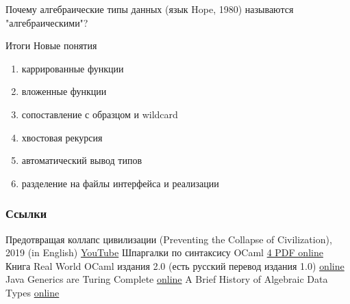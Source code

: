 \documentclass[aspectratio=169
  , xcolor={svgnames}
  , hyperref=
      { colorlinks
      , urlcolor=DarkBlue
      }
  , russian  %
  ]{beamer}
\begin{document}
\begin{frame}
\begin{center}
\Large{Почему алгебраические типы данных (язык Hope, 1980) называются "алгебраическими"?}
\vspace{5em}

\end{center}
\end{frame}


\begin{frame}{Итоги}
Новые понятия
\begin{enumerate}
\item каррированные функции
\item вложенные функции
\item сопоставление с образцом и wildcard
\item хвостовая рекурсия
\item автоматический вывод типов
\item разделение на файлы интерфейса и реализации
\end{enumerate}
\end{frame}

\begin{frame}[allowframebreaks]
\frametitle<presentation>{Ссылки}
\begin{thebibliography}{10}
    Предотвращая коллапс цивилизации (Preventing the Collapse of Civilization), 2019 (in English)
    \newblock\href{https://youtu.be/pW-SOdj4Kkk}{YouTube}
    Шпаргалки по синтаксису OCaml
    \newblock\href{https://ocaml.org/docs/cheat_sheets.html}{4 PDF online}
    Книга Real World OCaml издания 2.0 (есть русский перевод издания 1.0)
    \newblock\href{https://dev.realworldocaml.org/toc.html}{online}
    Java Generics are Turing Complete
    \newblock\href{https://arxiv.org/pdf/1605.05274}{online}
    A Brief History of Algebraic Data Types
    \newblock\href{https://docs.google.com/presentation/d/131_CYsd9mEL-0XqXMyV7JeahWgtNCUV_JwjH7WqYFcI/edit}{online}
\end{thebibliography}
\end{frame}
\end{document}
